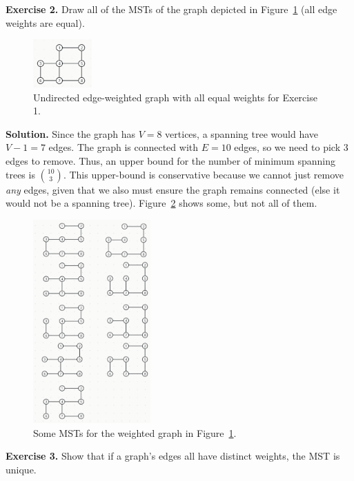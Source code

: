 \documentclass[12pt, a4paper]{article}
\newenvironment{ex}[2][Exercise]
{\par\medskip\noindent \textbf{#1 #2.}}
{\medskip}
\newenvironment{sol}[1][Solution]
{\par\medskip\noindent \textbf{#1.} }
{\medskip}
\begin{document}
	\begin{ex}{2}
		Draw all of the MSTs of the graph depicted in Figure~\ref{fig:ex-02} (all edge weights
		are equal).
		\begin{figure}
			\centering
			\includegraphics[width=0.2\textwidth]{exercise-02}
			\caption{Undirected edge-weighted graph with all equal weights for Exercise 1.}
			\label{fig:ex-02}
		\end{figure}
	\end{ex}
	\begin{sol}
		Since the graph has $V=8$ vertices, a spanning tree would have $V-1=7$
		edges. The graph is connected with $E=10$ edges, so we need to pick
		$3$ edges to remove. Thus, an upper bound for the number of minimum spanning
		trees is $\binom{10}{3}$. This upper-bound is conservative because we cannot
		just remove \emph{any} edges, given that we also must ensure the graph remains
		connected (else it would not be a spanning tree). Figure~\ref{fig:ex-02-solution} shows
		some, but not all of them.
		\begin{figure}
			\centering
			\includegraphics[width=0.4\textwidth]{exercise-02-solution}
			\caption{Some MSTs for the weighted graph in Figure~\ref{fig:ex-02}.}
			\label{fig:ex-02-solution}
		\end{figure}
	\end{sol}
	\begin{ex}{3}
		Show that if a graph's edges all have distinct weights, the MST is unique.
	\end{ex}
\end{document}
